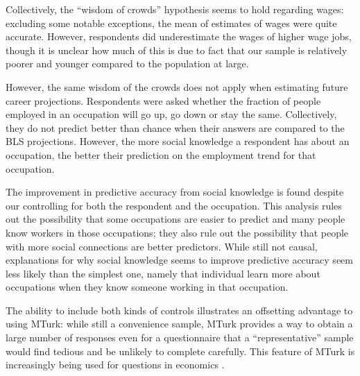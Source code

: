 \documentclass[11pt]{article}
\begin{document}
Collectively, the ``wisdom of crowds'' hypothesis seems to hold regarding wages: 
excluding some notable exceptions, the mean of estimates of wages were quite accurate. 
However, respondents did underestimate the wages of higher wage jobs,
though it is unclear how much of this is due to fact that our sample is relatively poorer and younger compared to the population at large. 


However, the same wisdom of the crowds does not apply when estimating future career projections.
Respondents were asked whether the fraction of people employed in an occupation will go up, go down or stay the same. 
Collectively, they do not predict better than chance when their answers are compared to the BLS projections. 
However, the more social knowledge a respondent has about an occupation, the better their prediction on the employment trend for that occupation. %

The improvement in predictive accuracy from social knowledge is found despite our controlling for both the respondent and the occupation.
This analysis rules out the possibility that some occupations are easier to predict and many people know workers in those occupations; 
they also rule out the possibility that people with more social connections are better predictors.
While still not causal, explanations for why social
knowledge seems to improve predictive accuracy seem less likely than the simplest one, namely that individual learn more about occupations when they know someone working in that occupation. 


The ability to include both kinds of controls illustrates an offsetting advantage to using MTurk: 
while still a convenience sample, MTurk provides a way to obtain a large number of responses even for a questionnaire that a ``representative'' sample would find tedious and be unlikely to complete carefully.
This feature of MTurk is increasingly being used for questions in economics  \citep{kuziemko2013elastic, saez2013generalized}. 
\end{document}
